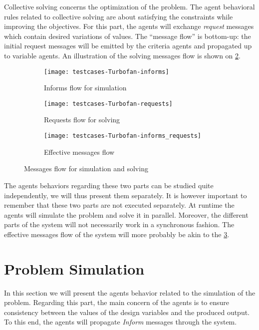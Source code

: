 Collective solving concerns the optimization of the problem. The agent behavioral rules related to collective solving are about satisfying the constraints while improving the objectives. For this part, the agents will exchange \emph{request} messages which contain desired variations of values. The \enquote{message flow} is bottom-up: the initial request messages will be emitted by the criteria agents and propagated up to variable agents. An illustration of the solving messages flow is shown on \figurename{} \ref{messages_flow:req}.

\begin{figure}[h]
	\begin{subfigure}[b]{0.4\textwidth}
		\centering
		\texttt{[image: testcases-Turbofan-informs]}
		\caption{Informs flow for simulation}\label{messages_flow:inf}
	\end{subfigure}
	\hfill
  	\begin{subfigure}[b]{0.4\textwidth}
		\centering
		\texttt{[image: testcases-Turbofan-requests]}
		\caption{Requests flow for solving}\label{messages_flow:req}
	\end{subfigure}

	\centering
	 \begin{subfigure}[b]{0.4\textwidth}
		\texttt{[image: testcases-Turbofan-informs\_requests]}
		\caption{Effective messages flow}\label{messages_flow:eff}
	\end{subfigure}
	
	\caption{Messages flow for simulation and solving}
	\label{messages_flow}

\end{figure}

The agents behaviors regarding these two parts can be studied quite independently, we will thus present them separately.  It is however important to remember that these two parts are not executed separately. At runtime the agents will simulate the problem and solve it in parallel. Moreover, the different parts of the system will not necessarily work in a synchronous fashion. The effective messages flow of the system will more probably be akin to the \figurename{} \ref{messages_flow:eff}.

\section{Problem Simulation}

In this section we will present the agents behavior related to the simulation of the problem. Regarding this part, the main concern of the agents is to ensure consistency between the values of the design variables and the produced output. To this end, the agents will propagate \emph{Inform} messages through the system.

